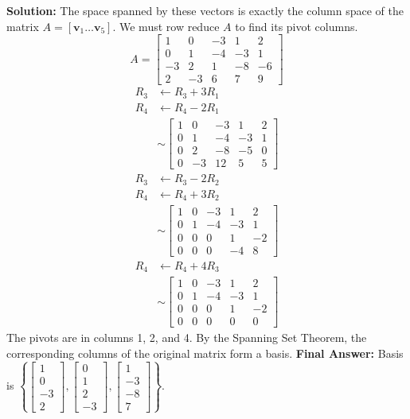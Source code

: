 \documentclass[12pt]{article}
\begin{document}
\textbf{Solution:}
The space spanned by these vectors is exactly the column space of the matrix $A = [\mathbf{v}_1 \dots \mathbf{v}_5]$. We must row reduce $A$ to find its pivot columns.
\[ A = \begin{bmatrix} 1 & 0 & -3 & 1 & 2 \\ 0 & 1 & -4 & -3 & 1 \\ -3 & 2 & 1 & -8 & -6 \\ 2 & -3 & 6 & 7 & 9 \end{bmatrix} \]
\begin{align*}
R_3 &\leftarrow R_3 + 3R_1 \\
R_4 &\leftarrow R_4 - 2R_1 \\
&\sim \begin{bmatrix} 1 & 0 & -3 & 1 & 2 \\ 0 & 1 & -4 & -3 & 1 \\ 0 & 2 & -8 & -5 & 0 \\ 0 & -3 & 12 & 5 & 5 \end{bmatrix} \\
R_3 &\leftarrow R_3 - 2R_2 \\
R_4 &\leftarrow R_4 + 3R_2 \\
&\sim \begin{bmatrix} 1 & 0 & -3 & 1 & 2 \\ 0 & 1 & -4 & -3 & 1 \\ 0 & 0 & 0 & 1 & -2 \\ 0 & 0 & 0 & -4 & 8 \end{bmatrix} \\
R_4 &\leftarrow R_4 + 4R_3 \\
&\sim \begin{bmatrix} 1 & 0 & -3 & 1 & 2 \\ 0 & 1 & -4 & -3 & 1 \\ 0 & 0 & 0 & 1 & -2 \\ 0 & 0 & 0 & 0 & 0 \end{bmatrix}
\end{align*}
The pivots are in columns 1, 2, and 4. By the Spanning Set Theorem, the corresponding columns of the original matrix form a basis.
\textbf{Final Answer:} Basis is $\left\{ \begin{bmatrix} 1 \\ 0 \\ -3 \\ 2 \end{bmatrix}, \begin{bmatrix} 0 \\ 1 \\ 2 \\ -3 \end{bmatrix}, \begin{bmatrix} 1 \\ -3 \\ -8 \\ 7 \end{bmatrix} \right\}$.
\end{document}
